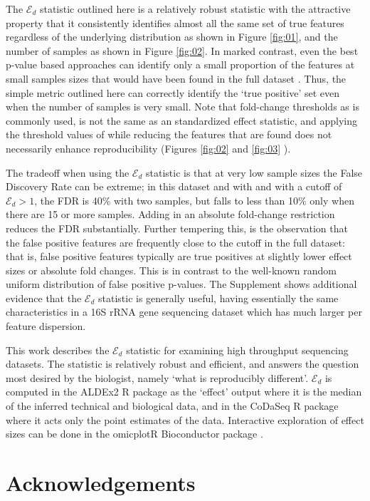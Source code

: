\documentclass{bioinfo}
\begin{document}
The $\mathcal{E}_{d}$ statistic outlined here is a relatively robust statistic with the attractive property that it consistently  identifies almost all the same set of true features regardless of the underlying distribution as shown in Figure \ref{fig:01}, and the number of samples as shown in Figure \ref{fig:02}. In marked contrast, even the best p-value based  approaches can identify only a small proportion of the features at small samples sizes that would have been found in the full dataset \citep{Schurch:2016aa}. Thus, the simple metric outlined here  can correctly identify the `true positive' set even when the number of samples is very small. Note that fold-change thresholds as is commonly used, is not the same as an standardized effect statistic, and applying the threshold values of \citep{Schurch:2016aa} while reducing the features that are found does not necessarily enhance reproducibility (Figures \ref{fig:02} and \ref{fig:03} ). 

The tradeoff when using the $\mathcal{E}_{d}$ statistic is that at very low sample sizes the False Discovery Rate can be extreme; in this dataset and with and with a cutoff of $\mathcal{E}_{d} > 1$, the FDR is 40\% with two samples, but falls to less than 10\% only when there are 15 or more samples. Adding in an absolute fold-change restriction reduces the FDR substantially. Further tempering this, is the observation that the false positive features are frequently  close to the cutoff in the full dataset: that is, false positive features typically are true positives at slightly lower effect sizes or absolute fold changes. This is in contrast to the well-known random uniform distribution of false positive p-values. The Supplement shows additional evidence that the  $\mathcal{E}_{d}$ statistic is generally useful, having essentially the same characteristics in a 16S rRNA gene sequencing dataset which has much larger per feature dispersion. 

This work  describes the  $\mathcal{E}_{d}$ statistic for examining high throughput sequencing datasets. The statistic is relatively robust and efficient, and answers the question most desired by the biologist, namely `what is reproducibly different'.   $\mathcal{E}_{d}$ is computed in the ALDEx2 R package as the `effect' output where it is the median of the inferred technical and biological data, and in the CoDaSeq R package where it acts only the point estimates of the data. Interactive exploration of effect sizes can be done in the omicplotR Bioconductor package \citep{omicplot}.
\section*{Acknowledgements}
\end{document}
